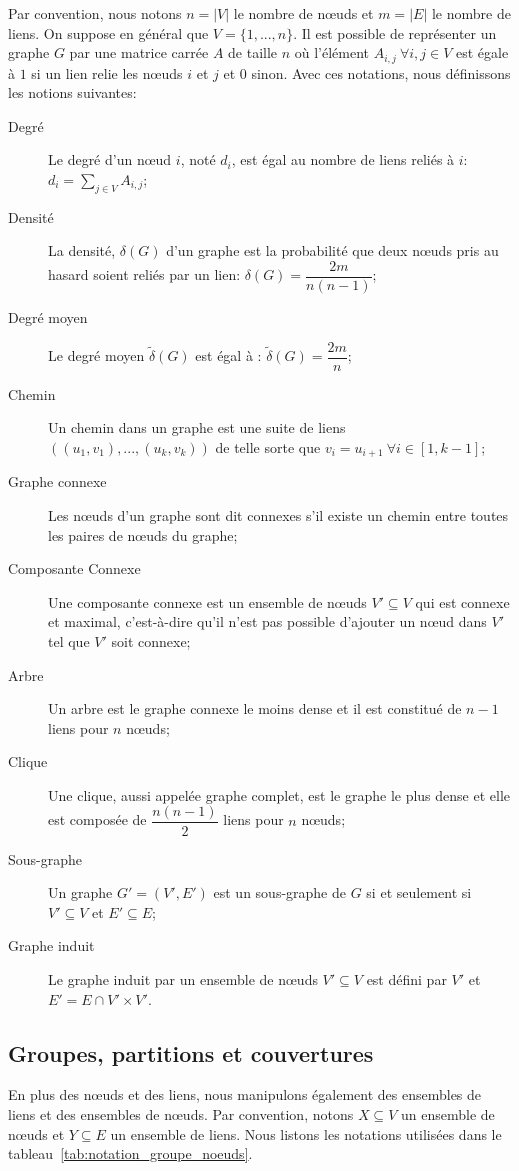 Par convention, nous notons $n=|V|$ le nombre de n\oe uds et $m=|E|$ le nombre de liens.
On suppose en général que $V=\{1, ..., n\}$.
Il est possible de représenter un graphe $G$ par une matrice carrée $A$ de taille $n$ où l'élément $A_{i,j} \ \forall i,j \in V$ est égale à $1$ si un lien relie les n\oe uds $i$ et $j$ et $0$ sinon.
Avec ces notations, nous définissons les notions suivantes:
\begin{description}
\item[Degré] Le degré d'un n\oe ud $i$, noté $d_i$, est égal au nombre de liens reliés à $i$: $d_i = \sum_{j \in V} A_{i,j}$;
\item[Densité] La densité, $\delta(G)$ d'un graphe est la probabilité que deux n\oe uds pris au hasard soient reliés par un lien: $\delta(G)=\dfrac{2m}{n(n-1)}$;
\item[Degré moyen] Le degré moyen $\tilde{\delta}(G)$ est égal à : $\tilde{\delta}(G)=\dfrac{2m}{n}$;
\item[Chemin] Un chemin dans un graphe est une suite de liens $((u_1,v_1),...,(u_k,v_k))$ de telle sorte que $v_{i}=u_{i+1} \ \forall i \in [1,k-1]$;
\item[Graphe connexe] Les n\oe uds d'un graphe sont dit connexes s'il existe un chemin entre toutes les paires de n\oe uds du graphe;
\item[Composante Connexe] Une composante connexe est un ensemble de n\oe uds $V'\subseteq V$ qui est connexe et maximal, c'est-à-dire qu'il n'est pas possible d'ajouter un n\oe ud dans $V'$ tel que $V'$ soit connexe;
\item[Arbre] Un arbre est le graphe connexe le moins dense et il est constitué de $n-1$ liens pour $n$ n\oe uds;
\item[Clique] Une clique, aussi appelée graphe complet, est le graphe le plus dense et elle est composée de $\dfrac{n(n-1)}{2}$ liens pour $n$ n\oe uds;
\item[Sous-graphe] Un graphe $G'=(V',E')$ est un sous-graphe de $G$ si et seulement si $V' \subseteq V$ et $E' \subseteq E$;
\item[Graphe induit] Le graphe induit par un ensemble de n\oe uds $V' \subseteq V$ est défini par $V'$ et $E'= E \cap V' \times V'$.  
\end{description}



\subsection{Groupes, partitions et couvertures}
En plus des n\oe uds et des liens, nous manipulons également des ensembles de liens et des ensembles de n\oe uds.
Par convention, notons $X \subseteq V$ un ensemble de n\oe uds et $Y \subseteq E$ un ensemble de liens.
Nous listons les notations utilisées dans le tableau~\ref{tab:notation_groupe_noeuds}.


